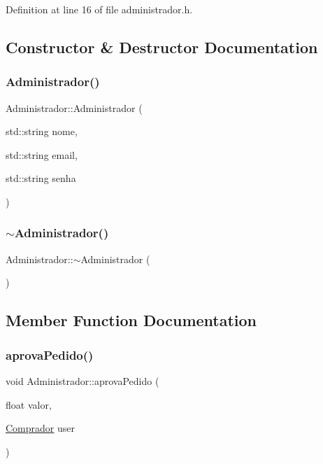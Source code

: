 Definition at line 16 of file administrador.\+h.



\subsection{Constructor \& Destructor Documentation}
\mbox{\label{class_administrador_a493c6aa5f70e459339fd7f05c12237b0}} 
\subsubsection{\texorpdfstring{Administrador()}{Administrador()}}
{\footnotesize\ttfamily Administrador\+::\+Administrador (\begin{DoxyParamCaption}\item[{std\+::string}]{nome,  }\item[{std\+::string}]{email,  }\item[{std\+::string}]{senha }\end{DoxyParamCaption})}

\mbox{\label{class_administrador_a0e044ad3a41da3a0ff2c1ec7ef8fa800}} 
\subsubsection{\texorpdfstring{$\sim$\+Administrador()}{~Administrador()}}
{\footnotesize\ttfamily Administrador\+::$\sim$\+Administrador (\begin{DoxyParamCaption}{ }\end{DoxyParamCaption})}



\subsection{Member Function Documentation}
\mbox{\label{class_administrador_a05604fe263be531162e5e98f57d5d5c2}} 
\subsubsection{\texorpdfstring{aprova\+Pedido()}{aprovaPedido()}}
{\footnotesize\ttfamily void Administrador\+::aprova\+Pedido (\begin{DoxyParamCaption}\item[{float}]{valor,  }\item[{\hyperlink{class_comprador}{Comprador}}]{user }\end{DoxyParamCaption})}

